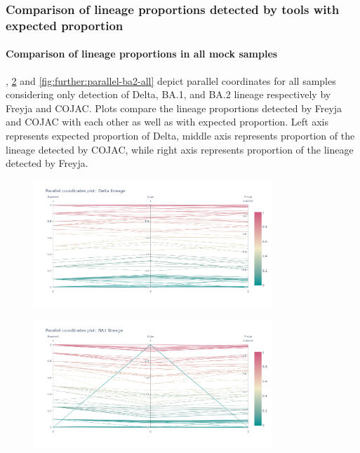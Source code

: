         \subsubsection{Comparison of lineage proportions detected by tools with expected proportion} 
        \paragraph{Comparison of lineage proportions in all mock samples} \label{sec:appendix:figures:parallel-all}
        , \cref{fig:further:parallel-ba1-all} and \cref{fig:further:parallel-ba2-all} depict parallel coordinates for all samples considering only detection of Delta, BA.1, and BA.2 lineage respectively by Freyja and COJAC. Plots compare the lineage proportions detected by Freyja and COJAC with each other as well as with expected proportion. Left axis represents expected proportion of Delta, middle axis represents proportion of the lineage detected by COJAC, while right axis represents proportion of the lineage detected by Freyja.
        \begin{figure}[htbp]
        	\centering
            \includegraphics[width=0.8\textwidth]{figures/further/pc-delta-all.png}
            \label{fig:further:parallel-delta-all}
        \end{figure}
        \begin{figure}[htbp]
        	\centering
            \includegraphics[width=0.8\textwidth]{figures/further/pc-ba1-all.png}
            \label{fig:further:parallel-ba1-all}
        \end{figure}
